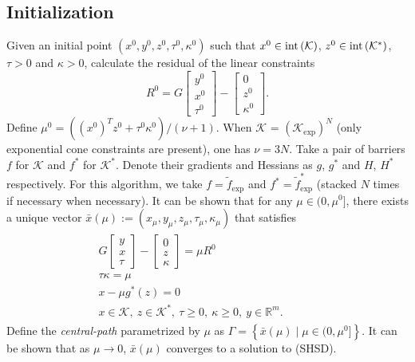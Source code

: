 \documentclass[10pt]{article}
\theoremstyle{definition}
\theoremstyle{plain}
\def\interior{\protect{\textnormal{int}}}
\begin{document}
\subsection{Initialization} Given an initial point $(x^0, y^0, z^0, \tau^0, \kappa^0)$ such that $x^0 \in \interior\left(\mathcal{K}\right)$, $z^0 \in \interior\left(\mathcal{K}^*\right)$, $\tau>0$ and $\kappa>0$, calculate the residual of the linear constraints
\[R^0 =  G
\begin{bmatrix}
y^0 \\ x^0 \\ \tau^0
\end{bmatrix} - 
\begin{bmatrix}
0 \\ z^0 \\ \kappa^0
\end{bmatrix}.\]
Define $\mu^0 = \left((x^0)^T z^0 + \tau^0\kappa^0\right)/(\nu+1)$.  When $\mathcal{K}$ = $\left(\mathcal{K}_{\exp}\right)^N$ (only exponential cone constraints are present), one has $\nu = 3N$. Take a pair of barriers $f$ for $\mathcal{K}$ and $f^*$ for $\mathcal{K}^*$. Denote their gradients and Hessians as $g$, $g^*$ and $H$, $H^*$ respectively. For this algorithm, we take $f = \tilde{f}_{\exp}$ and $f^* = \tilde{f}_{\exp}^*$ (stacked $N$ times if necessary when necessary). It can be shown that for any $\mu \in (0,\mu^0]$, there exists a unique vector $\bar{x}(\mu) := (x_\mu, y_\mu, z_\mu, \tau_\mu, \kappa_\mu)$ that satisfies
\begin{align*}
\begin{split}
G \begin{bmatrix}
y \\ x \\ \tau
\end{bmatrix} - 
\begin{bmatrix}
0 \\ z \\ \kappa 
\end{bmatrix} = 
\mu R^0 \\[1ex]
 \tau \kappa = \mu \\[1ex]
 x - \mu g^*(z) = 0 \\[1ex]
x \in \mathcal{K},\ z \in \mathcal{K}^*,\ \tau \geq 0,\ \kappa\geq 0,\ y \in \mathbb{R}^m.
\end{split} \quad \quad \quad
\end{align*}
Define the \textit{central-path} parametrized by $\mu$ as $\Gamma = \left\{ \bar{x}(\mu) \mid \mu \in (0,\mu^0] \right\}$. It can be shown that as $\mu \rightarrow 0$, $\bar{x}(\mu)$ converges to a solution to (SHSD).
\end{document}
